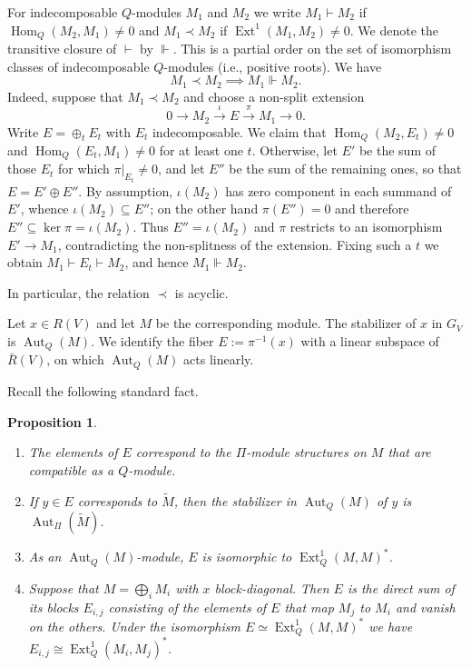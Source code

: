 \documentclass[12pt]{article}
\newtheorem{proposition}[theorem]{Proposition}
\newcommand{\Hom}{\operatorname{Hom}}
\newcommand{\Ext}{\operatorname{Ext}}
\newcommand{\Aut}{\operatorname{Aut}}
\newcommand{\rest}{\big |}
\newcommand{\homr}{\vdash}
\newcommand{\homrt}{\Vdash}
\newcommand{\extr}{\prec}
\begin{document}
For indecomposable $Q$-modules $M_1$ and $M_2$ we write $M_1\homr M_2$ if $\Hom_Q(M_2,M_1)\ne0$ and $M_1\extr M_2$ if $\Ext^1(M_1,M_2)\ne0$.
We denote the transitive closure of $\homr$ by $\homrt$. This is a partial order on the set of isomorphism classes of indecomposable $Q$-modules (i.e., positive roots).
We have
\begin{equation} \label{eq: extimplieshom}
M_1\extr M_2\implies M_1\homrt M_2.
\end{equation}
Indeed, suppose that $M_1\extr M_2$ and choose a non-split extension
\[
0\rightarrow M_2\xrightarrow{\ \iota\ }E\xrightarrow{\ \pi\ }M_1\rightarrow0.
\]
Write $E=\oplus_tE_t$ with $E_t$ indecomposable.
We claim that $\Hom_Q(M_2,E_t)\ne0$ and $\Hom_Q(E_t,M_1)\ne0$ for at least one $t$.
Otherwise, let $E'$ be the sum of those $E_t$ for which $\pi\rest_{E_t}\ne0$, and let $E''$ be the sum of the remaining ones,
so that $E=E'\oplus E''$.
By assumption, $\iota(M_2)$ has zero component in each summand of $E'$, whence $\iota(M_2)\subseteq E''$;
on the other hand $\pi(E'')=0$ and therefore $E''\subseteq\ker\pi=\iota(M_2)$.
Thus $E''=\iota(M_2)$ and $\pi$ restricts to an isomorphism $E'\rightarrow M_1$, contradicting the non-splitness of the extension.
Fixing such a $t$ we obtain $M_1\homr E_t\homr M_2$, and hence $M_1\homrt M_2$.

In particular, the relation $\extr$ is acyclic.

Let $x\in R(V)$ and let $M$ be the corresponding module.
The stabilizer of $x$ in $G_V$ is $\Aut_Q(M)$.
We identify the fiber $E:=\pi^{-1}(x)$ with a linear subspace of $\bar R(V)$, on which $\Aut_Q(M)$ acts linearly.

Recall the following standard fact.

\begin{proposition}
\begin{enumerate}
\item The elements of $E$ correspond to the $\Pi$-module structures on $M$ that are compatible as a $Q$-module.
\item If $y\in E$ corresponds to $\tilde M$, then the stabilizer in $\Aut_Q(M)$ of $y$ is $\Aut_\Pi(\tilde M)$.
\item As an $\Aut_Q(M)$-module, $E$ is isomorphic to $\Ext^1_Q(M,M)^*$.
\item Suppose that $M=\bigoplus_iM_i$ with $x$ block-diagonal. Then $E$ is
the direct sum of its blocks $E_{i,j}$ consisting of the
elements of $E$ that map $M_j$ to $M_i$ and vanish on the others.
Under the isomorphism $E\simeq\Ext^1_Q(M,M)^*$ we have $E_{i,j}\cong\Ext^1_Q(M_i,M_j)^*$.
\end{enumerate}
\end{proposition}
\end{document}
